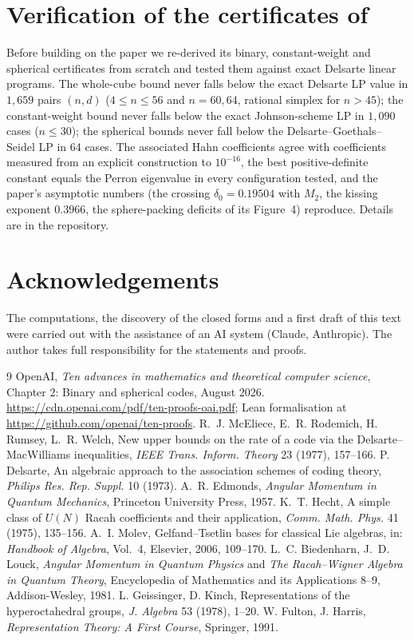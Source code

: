 \documentclass[11pt]{amsart}
\theoremstyle{definition}
\begin{document}
\section{Verification of the certificates of \cite{OAI2026}}\label{sec:audit}
Before building on the paper we re-derived its binary, constant-weight and spherical certificates from scratch and tested them against exact Delsarte linear programs. The whole-cube bound \cite[eq.~(23)]{OAI2026} never falls below the exact Delsarte LP value in $1{,}659$ pairs $(n,d)$ ($4\le n\le56$ and $n=60,64$, rational simplex for $n>45$); the constant-weight bound \cite[eq.~(46)]{OAI2026} never falls below the exact Johnson-scheme LP in $1{,}090$ cases ($n\le30$); the spherical bounds never fall below the Delsarte--Goethals--Seidel LP in $64$ cases. The associated Hahn coefficients \cite[(35)--(37)]{OAI2026} agree with coefficients measured from an explicit construction to $10^{-16}$, the best positive-definite constant equals the Perron eigenvalue in every configuration tested, and the paper's asymptotic numbers (the crossing $\delta_0=0.19504$ with $M_2$, the kissing exponent $0.3966$, the sphere-packing deficits of its Figure~4) reproduce. Details are in the repository.

\section*{Acknowledgements}
The computations, the discovery of the closed forms and a first draft of this text were carried out with the assistance of an AI system (Claude, Anthropic). The author takes full responsibility for the statements and proofs.

\begin{thebibliography}{9}
 OpenAI, \emph{Ten advances in mathematics and theoretical computer science}, Chapter 2: Binary and spherical codes, August 2026. \url{https://cdn.openai.com/pdf/ten-proofs-oai.pdf}; Lean formalisation at \url{https://github.com/openai/ten-proofs}.
 R.~J. McEliece, E.~R. Rodemich, H. Rumsey, L.~R. Welch, New upper bounds on the rate of a code via the Delsarte--MacWilliams inequalities, \emph{IEEE Trans. Inform. Theory} 23 (1977), 157--166.
 P. Delsarte, An algebraic approach to the association schemes of coding theory, \emph{Philips Res. Rep. Suppl.} 10 (1973).
 A.~R. Edmonds, \emph{Angular Momentum in Quantum Mechanics}, Princeton University Press, 1957.
 K.~T. Hecht, A simple class of $U(N)$ Racah coefficients and their application, \emph{Comm. Math. Phys.} 41 (1975), 135--156.
 A.~I. Molev, Gelfand--Tsetlin bases for classical Lie algebras, in: \emph{Handbook of Algebra}, Vol.~4, Elsevier, 2006, 109--170.
 L.~C. Biedenharn, J.~D. Louck, \emph{Angular Momentum in Quantum Physics} and \emph{The Racah--Wigner Algebra in Quantum Theory}, Encyclopedia of Mathematics and its Applications 8--9, Addison-Wesley, 1981.
 L. Geissinger, D. Kinch, Representations of the hyperoctahedral groups, \emph{J. Algebra} 53 (1978), 1--20.
 W. Fulton, J. Harris, \emph{Representation Theory: A First Course}, Springer, 1991.
\end{thebibliography}
\end{document}
